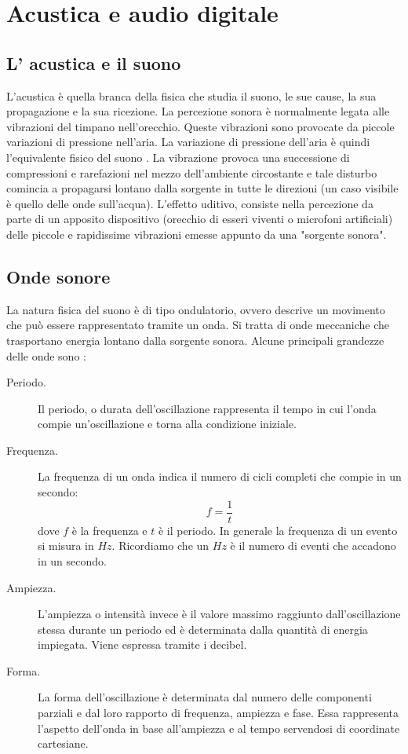 

\chapter{Acustica e audio digitale}

\section{L' acustica e il suono}

L'acustica \`e quella branca della fisica che studia il suono, le sue cause, la sua propagazione e la sua ricezione.
La percezione sonora \`e normalmente legata alle vibrazioni del timpano nell'orecchio. 
Queste vibrazioni sono provocate da piccole variazioni di pressione nell'aria. 
La variazione di pressione dell'aria \`e quindi l'equivalente fisico del suono \cite{EAP}.
La vibrazione provoca una successione di compressioni e rarefazioni nel mezzo dell'ambiente circostante e tale disturbo comincia a propagarsi lontano dalla sorgente in tutte le direzioni (un caso visibile \`e quello delle onde sull'acqua). 
L'effetto uditivo, consiste nella percezione da parte di un apposito dispositivo (orecchio di esseri viventi o microfoni artificiali) delle piccole e rapidissime vibrazioni emesse appunto da una "sorgente sonora".

\section{Onde sonore}
La natura fisica del suono \`e di tipo ondulatorio, ovvero descrive un movimento che pu\`o essere rappresentato tramite un onda. 
Si tratta di onde meccaniche che trasportano energia lontano dalla sorgente sonora.
Alcune principali grandezze delle onde sono \cite{SELET}:
   \begin{description}
      \item[Periodo.] 
	Il periodo, o durata dell'oscillazione rappresenta il tempo in cui l'onda compie un'oscillazione e torna alla condizione iniziale.  
      \item[Frequenza.]
	La frequenza di un onda indica il numero di cicli completi che compie in un secondo:
	\[
	  f = \frac{1}{t}
	\]
	dove $f$ \`e la frequenza e $t$ \`e il periodo.
	In generale la frequenza di un evento si misura in $Hz$. 
	Ricordiamo che un $Hz$ \`e il numero di eventi che accadono in un secondo. 
      \item[Ampiezza.]
      L'ampiezza o intensit\`a invece \`e il valore massimo raggiunto dall'oscillazione stessa durante un periodo ed \`e determinata dalla quantit\`a di energia impiegata. 
      Viene espressa tramite i decibel.
      \item[Forma.]
	La forma dell'oscillazione \`e determinata dal numero delle componenti parziali e dal loro rapporto di frequenza, ampiezza e  fase. 
	Essa rappresenta l'aspetto dell'onda in base all'ampiezza e al tempo servendosi di coordinate cartesiane. 
    \end{description}
    

